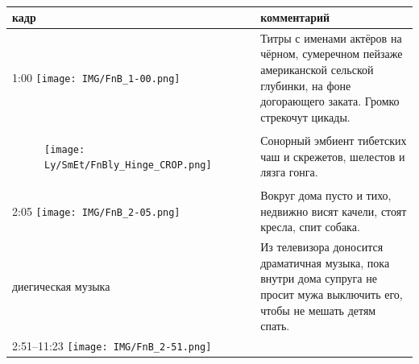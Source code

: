 \begin{longtable}[]{@{}ll@{}}
\toprule
\begin{minipage}[b]{0.29\columnwidth}\raggedright\strut
кадр\strut
\end{minipage} & \begin{minipage}[b]{0.65\columnwidth}\raggedright\strut
комментарий\strut
\end{minipage}\tabularnewline
\midrule
\endhead
\begin{minipage}[t]{0.29\columnwidth}\raggedright\strut
1:00
\texttt{[image: IMG/FnB\_1-00.png]}\strut
\end{minipage} & \begin{minipage}[t]{0.65\columnwidth}\raggedright\strut
Титры с именами актёров на чёрном, сумеречном пейзаже
американской сельской глубинки, на фоне догорающего заката.
Громко стрекочут цикады.\strut
\end{minipage}\tabularnewline
\begin{minipage}[t]{0.29\columnwidth}\raggedright\strut
\begin{figure}
\centering
\texttt{[image: Ly/SmEt/FnBly\_Hinge\_CROP.png]}
\caption{}
\end{figure}
\strut
\end{minipage} & \begin{minipage}[t]{0.65\columnwidth}\raggedright\strut
Сонорный эмбиент тибетских чаш и скрежетов, шелестов и лязга гонга.\strut
\end{minipage}\tabularnewline
\begin{minipage}[t]{0.29\columnwidth}\raggedright\strut
2:05
\texttt{[image: IMG/FnB\_2-05.png]}\strut
\end{minipage} & \begin{minipage}[t]{0.65\columnwidth}\raggedright\strut
Вокруг дома пусто и тихо, недвижно висят качели, стоят кресла,
спит собака.\strut
\end{minipage}\tabularnewline
\begin{minipage}[t]{0.29\columnwidth}\raggedright\strut
диегическая музыка\strut
\end{minipage} & \begin{minipage}[t]{0.65\columnwidth}\raggedright\strut
Из телевизора доносится драматичная музыка, пока внутри дома
супруга не просит мужа выключить его, чтобы не мешать детям спать.\strut
\end{minipage}\tabularnewline
\begin{minipage}[t]{0.29\columnwidth}\raggedright\strut
2:51--11:23
\texttt{[image: IMG/FnB\_2-51.png]}\strut

\end{minipage}
\end{longtable}
